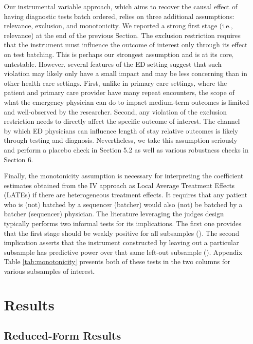 \documentclass[,,nonblindrev]{informs}
\begin{document}
Our instrumental variable approach, which aims to recover the causal
effect of having diagnostic tests batch ordered, relies on three
additional assumptions: relevance, exclusion, and monotonicity. We
reported a strong first stage (i.e., relevance) at the end of the
previous Section. The exclusion restriction requires that the instrument
must influence the outcome of interest only through its effect on test
batching. This is perhaps our strongest assumption and is at its core,
untestable. However, several features of the ED setting suggest that
such violation may likely only have a small impact and may be less
concerning than in other health care settings. First, unlike in primary
care settings, where the patient and primary care provider have many
repeat encounters, the scope of what the emergency physician can do to
impact medium-term outcomes is limited and well-observed by the
researcher. Second, any violation of the exclusion restriction needs to
directly affect the specific outcome of interest. The channel by which
ED physicians can influence length of stay relative outcomes is likely
through testing and diagnosis. Nevertheless, we take this assumption
seriously and perform a placebo check in Section 5.2 as well as various
robustness checks in Section 6.

Finally, the monotonicity assumption is necessary for interpreting the
coefficient estimates obtained from the IV approach as Local Average
Treatment Effects (LATEs) if there are heterogeneous treatment effects.
It requires that any patient who is (not) batched by a sequencer
(batcher) would also (not) be batched by a batcher (sequencer)
physician. The literature leveraging the judges design typically
performs two informal tests for its implications. The first one provides
that the first stage should be weakly positive for all subsamples
(\citet{dobbie2018effects}). The second implication asserts that the
instrument constructed by leaving out a particular subsample has
predictive power over that same left-out subsample
(\citet{bhuller2020incarceration}). Appendix Table
\ref{tab:monotonicity} presents both of these tests in the two columns
for various subsamples of interest.

\hypertarget{sec:4}{%
\section{Results}\label{sec:4}}

\hypertarget{reduced-form-results}{%
\subsection{Reduced-Form Results}\label{reduced-form-results}}
\end{document}
